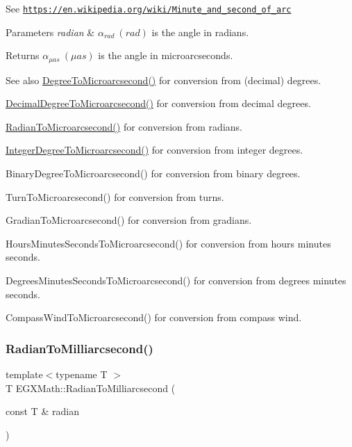 See \href{https://en.wikipedia.org/wiki/Minute_and_second_of_arc}{\tt https\+://en.\+wikipedia.\+org/wiki/\+Minute\+\_\+and\+\_\+second\+\_\+of\+\_\+arc} 
\begin{DoxyParams}{Parameters}
{\em radian} & $\alpha_{rad}\ (rad)$ is the angle in radians. \\
\hline
\end{DoxyParams}
\begin{DoxyReturn}{Returns}
$\alpha_{\mu as}\ (\mu as)$ is the angle in microarcseconds. 
\end{DoxyReturn}
\begin{DoxySeeAlso}{See also}
\mbox{\hyperlink{group___e_g_x_math-_angle_conversions-_degree_ga31b65388fe1b4656663b3d66b9d764e6}{Degree\+To\+Microarcsecond()}} for conversion from (decimal) degrees. 

\mbox{\hyperlink{group___e_g_x_math-_angle_conversions-_decimal_degree_ga6fa88456069907fd24716fa575517571}{Decimal\+Degree\+To\+Microarcsecond()}} for conversion from decimal degrees. 

\mbox{\hyperlink{group___e_g_x_math-_angle_conversions-_radian_ga3a515ca2838a305fa40750763f546a86}{Radian\+To\+Microarcsecond()}} for conversion from radians. 

\mbox{\hyperlink{group___e_g_x_math-_angle_conversions-_integer_degree_ga69179d6082764595c7014805e1f6b31e}{Integer\+Degree\+To\+Microarcsecond()}} for conversion from integer degrees. 

Binary\+Degree\+To\+Microarcsecond() for conversion from binary degrees. 

Turn\+To\+Microarcsecond() for conversion from turns. 

Gradian\+To\+Microarcsecond() for conversion from gradians. 

Hours\+Minutes\+Seconds\+To\+Microarcsecond() for conversion from hours minutes seconds. 

Degrees\+Minutes\+Seconds\+To\+Microarcsecond() for conversion from degrees minutes seconds. 

Compass\+Wind\+To\+Microarcsecond() for conversion from compass wind. 
\end{DoxySeeAlso}
\mbox{\label{group___e_g_x_math-_angle_conversions-_radian_ga84fbb494a455cfeb30be62776f96c9a9}} 
\subsubsection{\texorpdfstring{Radian\+To\+Milliarcsecond()}{RadianToMilliarcsecond()}}
{\footnotesize\ttfamily template$<$typename T $>$ \\
T E\+G\+X\+Math\+::\+Radian\+To\+Milliarcsecond (\begin{DoxyParamCaption}\item[{const T \&}]{radian }\end{DoxyParamCaption})}



